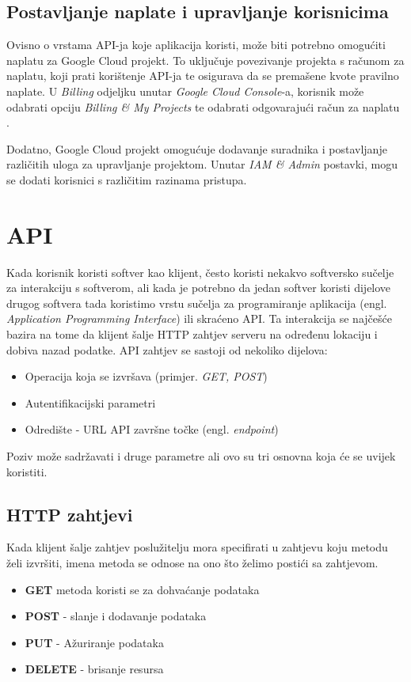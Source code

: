 \documentclass{foi}
\begin{document}
\section{Postavljanje naplate i upravljanje korisnicima}

Ovisno o vrstama API-ja koje aplikacija koristi, može biti potrebno omogućiti naplatu za Google Cloud projekt. To uključuje povezivanje projekta s računom za naplatu, koji prati korištenje API-ja te osigurava da se premašene kvote pravilno naplate. U \textit{Billing} odjeljku unutar \textit{Google Cloud Console}-a, korisnik može odabrati opciju \textit{Billing \& My Projects} te odabrati odgovarajući račun za naplatu \cite{GoogleWorkspace2024}.

Dodatno, Google Cloud projekt omogućuje dodavanje suradnika i postavljanje različitih uloga za upravljanje projektom. Unutar \textit{IAM \& Admin} postavki, mogu se dodati korisnici s različitim razinama pristupa.\cite{GoogleWorkspace2024}
\chapter{API}
Kada korisnik koristi softver kao klijent, često koristi nekakvo softversko sučelje za interakciju s softverom, ali kada je potrebno da jedan softver koristi dijelove drugog softvera tada koristimo vrstu sučelja za programiranje aplikacija (engl. \textit{Application Programming Interface}) ili skraćeno API.\cite{biehl2015api}
Ta interakcija se najčešće bazira na tome da klijent šalje HTTP zahtjev serveru na određenu lokaciju i dobiva nazad podatke.
API zahtjev se sastoji od nekoliko dijelova:
\begin{itemize}
    \item Operacija koja se izvršava (primjer. \textit{GET, POST})
    \item Autentifikacijski parametri
    \item Odredište - URL API završne točke (engl. \textit{endpoint})
\end{itemize}
Poziv može sadržavati i druge parametre ali ovo su tri osnovna koja će se uvijek koristiti.\cite{altexsoft}
\section{HTTP zahtjevi}
Kada klijent šalje zahtjev poslužitelju mora specifirati u zahtjevu koju metodu želi izvršiti, imena metoda se odnose na ono što želimo postići sa zahtjevom. \cite{Maurya2021} 
\begin{itemize}
    \item \textbf{GET} metoda koristi se za dohvaćanje podataka
    \item \textbf{POST} - slanje i dodavanje podataka
    \item \textbf{PUT} - Ažuriranje podataka
    \item \textbf{DELETE} - brisanje resursa 
\end{itemize}
\end{document}
